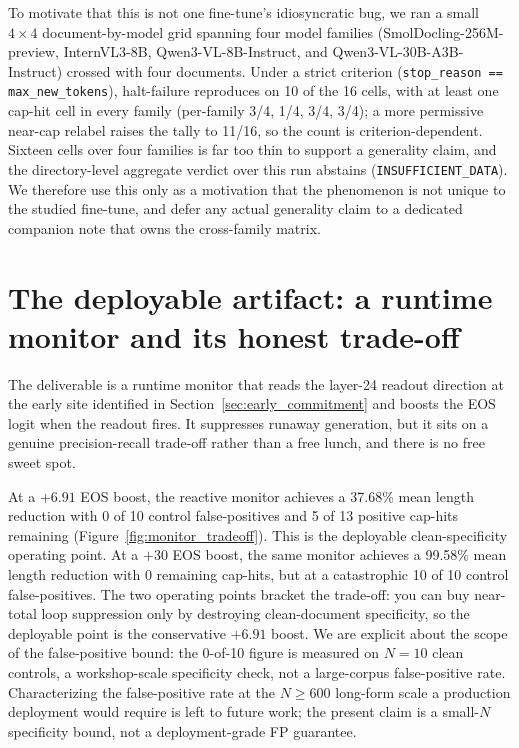 \documentclass[11pt]{article}
\begin{document}
To motivate that this is not one fine-tune's idiosyncratic bug, we ran a small
$4 \times 4$ document-by-model grid spanning four model families (SmolDocling-256M-preview,
InternVL3-8B, Qwen3-VL-8B-Instruct, and Qwen3-VL-30B-A3B-Instruct) crossed with four
documents. Under a strict criterion (\texttt{stop\_reason == max\_new\_tokens}), halt-failure
reproduces on 10 of the 16 cells, with at least one cap-hit cell in every family (per-family
3/4, 1/4, 3/4, 3/4); a more permissive near-cap relabel raises the tally to 11/16, so the
count is criterion-dependent. Sixteen cells over four families is far too thin to support a
generality claim, and the directory-level aggregate verdict over this run abstains
(\texttt{INSUFFICIENT\_DATA}). We therefore use this only as a motivation that the
phenomenon is not unique to the studied fine-tune, and defer any actual generality claim to
a dedicated companion note that owns the cross-family matrix.

\section{The deployable artifact: a runtime monitor and its honest trade-off}
\label{sec:production}

The deliverable is a runtime monitor that reads the layer-24 readout direction at the
early site identified in Section~\ref{sec:early_commitment} and boosts the EOS logit when
the readout fires. It suppresses runaway generation, but it sits on a genuine
precision-recall trade-off rather than a free lunch, and there is no free sweet spot.

At a $+6.91$ EOS boost, the reactive monitor achieves a 37.68\% mean length reduction
with 0 of 10 control false-positives and 5 of 13 positive cap-hits remaining
(Figure~\ref{fig:monitor_tradeoff}). This is the deployable clean-specificity operating
point. At a $+30$ EOS boost, the same monitor achieves a 99.58\% mean length reduction
with 0 remaining cap-hits, but at a catastrophic 10 of 10 control false-positives. The two
operating points bracket the trade-off: you can buy near-total loop suppression only by
destroying clean-document specificity, so the deployable point is the conservative $+6.91$
boost. We are explicit about the scope of the false-positive bound: the 0-of-10 figure is
measured on $N=10$ clean controls, a workshop-scale specificity check, not a large-corpus
false-positive rate. Characterizing the false-positive rate at the $N \geq 600$ long-form
scale a production deployment would require is left to future work; the present claim is a
small-$N$ specificity bound, not a deployment-grade FP guarantee.
\end{document}
